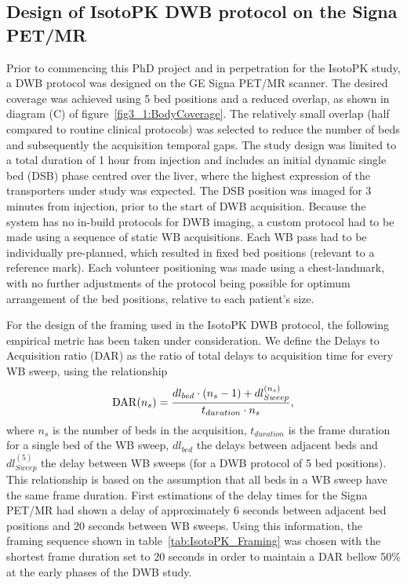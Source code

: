 \subsection{Design of IsotoPK DWB protocol on the Signa PET/MR}
Prior to commencing this PhD project and in perpetration for the IsotoPK study, a DWB protocol was designed on the GE Signa PET/MR scanner. The desired coverage was achieved using 5 bed positions and a reduced overlap, as shown in diagram (C) of figure~\ref{fig3_1:BodyCoverage}. The relatively small overlap (half compared to routine clinical protocols) was selected to reduce the number of beds and subsequently the acquisition temporal gaps.
The study design was limited to a total duration of 1 hour from injection and includes an initial dynamic single bed (DSB) phase centred over the liver, where the highest expression of the transporters under study was expected. 
The DSB position was imaged for 3 minutes from injection, prior to the start of DWB acquisition.
Because the system has no in-build protocols for DWB imaging, a custom protocol had to be made using a sequence of static WB acquisitions. Each WB pass had to be individually pre-planned, which resulted in fixed bed positions (relevant to a reference mark). Each volunteer positioning was made using a chest-landmark, with no further adjustments of the protocol being possible for optimum arrangement of the bed positions, relative to each patient's size.

For the design of the framing used in the IsotoPK DWB protocol, the following empirical metric has been taken under consideration. We define the Delays to Acquisition ratio (DAR) as the ratio of total delays to acquisition time for every WB sweep, using the relationship
\begin{equation} \label{eqn:acq_to_dead_time}
 \mathrm{DAR}(n_s) = \frac{dl_{bed}\cdot (n_s-1) + dl_{Sweep}^{(n_s)}}{t_{duration}\cdot n_s }  \\ , \\ 
\end{equation}
where $n_s$ is the number of beds in the acquisition, $t_{duration}$ is the frame duration for a single bed of the WB sweep, $dl_{bed}$ the delays between adjacent beds and $dl_{Sweep}^{(5)}$ the delay between WB sweeps (for a DWB protocol of 5 bed positions). This relationship is based on the assumption that all beds in a WB sweep have the same frame duration.
First estimations of the delay times for the Signa PET/MR had shown a delay of approximately 6 seconds between adjacent bed positions and 20 seconds between WB sweeps. Using this information, the framing sequence shown in table~\ref{tab:IsotoPK_Framing} was chosen with the shortest frame duration set to 20 seconds in order to maintain a DAR bellow 50\% at the early phases of the DWB study. 

